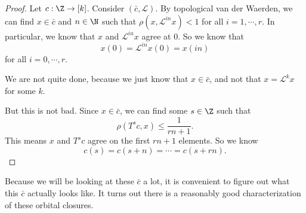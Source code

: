 \documentclass[a4paper]{article}
\begin{document}
\begin{proof}
  Let $c: \Z \to [k]$. Consider $(\bar{c}, \mathcal{L})$. By topological van der Waerden, we can find $x \in \bar{c}$ and $n \in \N$ such that $\rho(x, \mathcal{L}^{in} x) < 1$ for all $i = 1, \cdots, r$. In particular, we know that $x$ and $\mathcal{L}^{in} x$ agree at $0$. So we know that
  \[
    x(0) = \mathcal{L}^{in} x(0) = x(in)
  \]
  for all $i = 0, \cdots, r$.

  We are not quite done, because we just know that $x \in \bar{c}$, and not that $x = \mathcal{L}^k x$ for some $k$.

  But this is not bad. Since $x \in \bar{c}$, we can find some $s \in \Z$ such that
  \[
    \rho(T^s c, x) \leq \frac{1}{rn + 1}.
  \]
  This means $x$ and $T^s c$ agree on the first $rn + 1$ elements. So we know
  \[
    c(s) = c(s + n) = \cdots = c(s + rn).
  \]
\end{proof}

Because we will be looking at these $\bar{c}$ a lot, it is convenient to figure out what this $\bar{c}$ actually looks like. It turns out there is a reasonably good characterization of these orbital closures.
\end{document}

